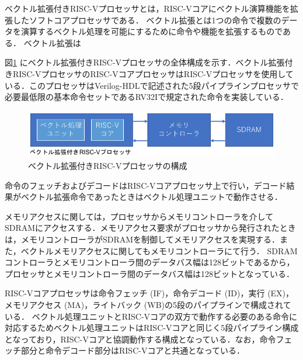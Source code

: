 ベクトル拡張付きRISC-Vプロセッサとは，RISC-Vコアにベクトル演算機能を拡張したソフトコアプロセッサである．
ベクトル拡張とは1つの命令で複数のデータを演算するベクトル処理を可能にするために命令や機能を拡張するものである．
ベクトル拡張は



図\ref{fig:MIQS_system}
にベクトル拡張付きRISC-Vプロセッサの全体構成を示す．ベクトル拡張付きRISC-VプロセッサのRISC-VコアプロセッサはRISC-Vプロセッサを使用している．このプロセッサはVerilog-HDLで記述された5段パイプラインプロセッサで必要最低限の基本命令セットであるRV32Iで規定された命令を実装している．

\begin{figure}[b]
\begin{center}
    \includegraphics[scale=1.2]{image/MIQS_system.pdf}
    \caption{ベクトル拡張付きRISC-Vプロセッサの構成}
    \label{fig:MIQS_system}
\end{center}
\end{figure}

命令のフェッチおよびデコードはRISC-Vコアプロセッサ上で行い，デコード結果がベクトル拡張命令であったときはベクトル処理ユニットで動作させる．

メモリアクセスに関しては，プロセッサからメモリコントローラを介してSDRAMにアクセスする．メモリアクセス要求がプロセッサから発行されたときは，メモリコントローラがSDRAMを制御してメモリアクセスを実現する．また，ベクトルメモリアクセスに関してもメモリコントローラにて行う．
SDRAMコントローラとメモリコントローラ間のデータバス幅は128ビットであるから，プロセッサとメモリコントローラ間のデータバス幅は128ビットとなっている．

RISC-Vコアプロセッサは命令フェッチ (IF)，命令デコード (ID)，実行 (EX)，メモリアクセス (MA)，ライトバック (WB)の5段のパイプラインで構成されている．
ベクトル処理ユニットとRISC-Vコアの双方で動作する必要のある命令に対応するためベクトル処理ユニットはRISC-Vコアと同じく5段パイプライン構成となっており，RISC-Vコアと協調動作する構成となっている．なお，命令フェッチ部分と命令デコード部分はRISC-Vコアと共通となっている．

